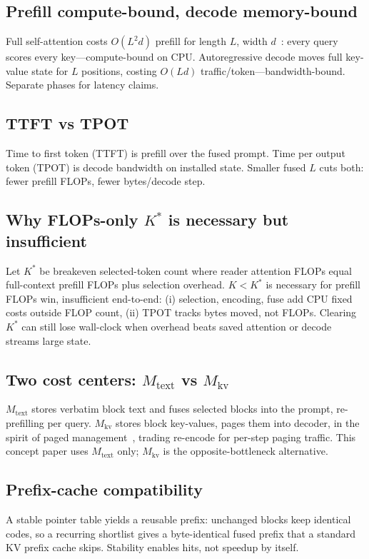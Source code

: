 \label{sec:latency}
\subsection{Prefill compute-bound, decode memory-bound}
Full self-attention costs $O(L^2 d)$ prefill for length $L$, width $d$~\cite{vaswani2017attention}: every query scores every key---compute-bound on CPU. Autoregressive decode moves full key-value state for $L$ positions, costing $O(Ld)$ traffic/token---bandwidth-bound. Separate phases for latency claims.

\subsection{TTFT vs TPOT}
Time to first token (TTFT) is prefill over the fused prompt. Time per output token (TPOT) is decode bandwidth on installed state. Smaller fused $L$ cuts both: fewer prefill FLOPs, fewer bytes/decode step.

\subsection{Why FLOPs-only $K^\ast$ is necessary but insufficient}
Let $K^\ast$ be breakeven selected-token count where reader attention FLOPs equal full-context prefill FLOPs plus selection overhead. $K < K^\ast$ is necessary for prefill FLOPs win, insufficient end-to-end: (i) selection, encoding, fuse add CPU fixed costs outside FLOP count, (ii) TPOT tracks bytes moved, not FLOPs. Clearing $K^\ast$ can still lose wall-clock when overhead beats saved attention or decode streams large state.

\subsection{Two cost centers: $M_{\mathrm{text}}$ vs $M_{\mathrm{kv}}$}
$M_{\mathrm{text}}$ stores verbatim block text and fuses selected blocks into the prompt, re-prefilling per query. $M_{\mathrm{kv}}$ stores block key-values, pages them into decoder, in the spirit of paged management~\cite{kwon2023pagedattention}, trading re-encode for per-step paging traffic. This concept paper uses $M_{\mathrm{text}}$ only; $M_{\mathrm{kv}}$ is the opposite-bottleneck alternative.

\subsection{Prefix-cache compatibility}
A stable pointer table yields a reusable prefix: unchanged blocks keep identical codes, so a recurring shortlist gives a byte-identical fused prefix that a standard KV prefix cache skips. Stability enables hits, not speedup by itself.
